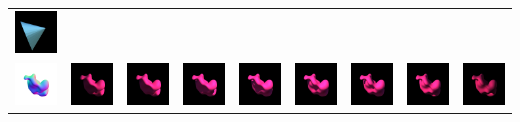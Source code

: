 \begin{center}
\begin{longtable}{@{}c@{}c@{}c@{}c@{}c@{}c@{}c@{}c@{}c@{}}
\includegraphics[width=0.1\linewidth]{training/12_7.png} \\
\includegraphics[width=0.1\linewidth]{training/13_gt.png} & \includegraphics[width=0.1\linewidth]{training/13_0.png} &
\includegraphics[width=0.1\linewidth]{training/13_1.png} & \includegraphics[width=0.1\linewidth]{training/13_2.png} &
\includegraphics[width=0.1\linewidth]{training/13_3.png} & \includegraphics[width=0.1\linewidth]{training/13_4.png} &
\includegraphics[width=0.1\linewidth]{training/13_5.png} & \includegraphics[width=0.1\linewidth]{training/13_6.png} &
\includegraphics[width=0.1\linewidth]{training/13_7.png} \\

\end{longtable}
\end{center}
